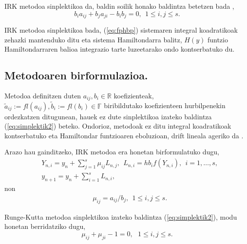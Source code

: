 IRK metodoa sinplektikoa da, baldin soilik honako baldintza betetzen bada  \cite{JMSanz-Serna1994} ,
\begin{equation}
\label{eq:simplektik2}
b_{i}a_{ij}+b_{j}a_{ji}-b_{i}b_{j}=0, \ \ 1 \leqslant i,j \leqslant s.
\end{equation}   

IRK metodoa sinplektikoa bada, (\ref{eq:fphbp}) sistemaren integral koadratikoak zehazki mantenduko ditu eta sistema Hamiltondarra balitz, $H(y)$ funtzio Hamiltondarraren balioa integrazio tarte luzeetarako ondo kontserbatuko du.

\subsection{Metodoaren birformulazioa.}

Metodoa definitzen duten $a_{ij},b_i  \in \mathbb{R}$ koefizienteak, $\tilde a_{ij}:=fl(a_{ij}),\tilde b_i:=fl(b_i) \in \mathbb{F}$ biribildutako koefizienteen hurbilpenekin ordezkatzen ditugunean, hauek ez dute sinplektikoa izateko baldintza (\ref{eq:simplektik2}) beteko. Ondorioz, metodoak ez ditu integral koadratikoak kontserbatuko eta Hamiltondar funtzioaren eboluzioan, drift lineala ageriko da \cite{JMSanz-Serna1994}.    
  
Arazo hau gainditzeko, IRK metodoa era honetan birformulatuko dugu,
\begin{align}
\label{eq:irk1}
&Y_{n,i}=y_n+ \sum\limits_{j=1}^{s} \mu_{ij} L_{n,j},  \ \ L_{n,i}=hb_if(Y_{n,i}), \ \ i=1,\dots,s,\\
\label{eq:irk2}
&y_{n+1}=y_n+\sum\limits_{i=1}^{s} L_{n,i},
\end{align}
non 
\begin{align*}
&\mu_{ij}=a_{ij}/{b_j}, \ \ 1 \leqslant i,j \leqslant s.
\end{align*}

Runge-Kutta metodoa sinplektikoa izateko baldintza (\ref{eq:simplektik2}), modu honetan berridatziko dugu,
\begin{equation}
\label{eq:sinplekmij}
\mu_{ij}+\mu_{ji}-1=0, \ \ \ 1 \leqslant i,j \leqslant s.
\end{equation}
 
